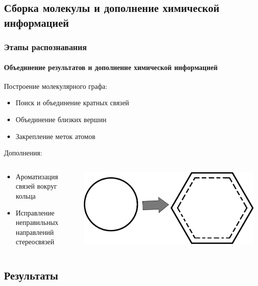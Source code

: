 \subsection{Сборка молекулы и дополнение химической информацией}

\begin{frame}
  \frametitle{Этапы распознавания}
  \framesubtitle{Объединение результатов и дополнение химической информацией}
  Построение молекулярного графа:
  \begin{itemize}
    \item Поиск и объединение кратных связей
    \item Объединение близких вершин
    \item Закрепление меток атомов
  \end{itemize}
  Дополнения:
  \begin{columns}
    \begin{column}{0.5\textwidth}
  \begin{itemize}
    \item Ароматизация связей вокруг кольца
    \item Исправление неправильных направлений стереосвязей
  \end{itemize}
\end{column}
\begin{column}{0.5\textwidth}
    \includegraphics[scale=0.3]{media/aromatic.pdf}
\end{column}
\end{columns}
\end{frame}

\subsection{Результаты}

